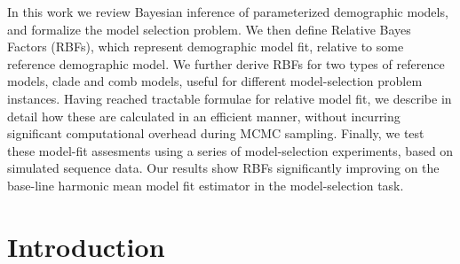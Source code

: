 \documentclass[11pt]{article}
\newcommand{\1}{\mathbbm{1}}
\begin{document}
In this work we review Bayesian inference of parameterized demographic models, and formalize the model selection problem.
%
We then define Relative Bayes Factors (RBFs), which represent demographic model fit, relative to some reference demographic model. We further derive RBFs for two types of reference models, clade and comb models, useful for different model-selection problem instances.
%
Having reached tractable formulae for relative model fit, we describe in detail how these are calculated in an efficient manner, without incurring significant computational overhead during MCMC sampling. 
%
Finally, we test these model-fit assesments using a series of model-selection experiments, based on simulated sequence data.
%
Our results show RBFs significantly improving on the base-line harmonic mean model fit estimator in the model-selection task.

\newpage

\tableofcontents

\newpage








\section{Introduction}
\end{document}
